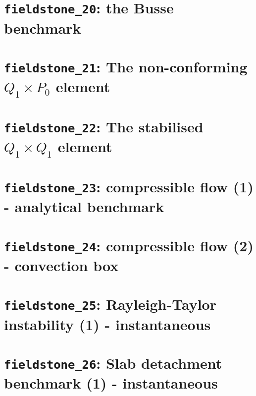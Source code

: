 \documentclass[a4paper]{article}
\begin{document}
\newpage
\section{{\tt fieldstone\_20}: the Busse benchmark \label{f20}}


\newpage
\section{{\tt fieldstone\_21}: The non-conforming $Q_1 \times P_0$ element \label{f21}}


\newpage
\section{{\tt fieldstone\_22}: The stabilised $Q_1 \times Q_1$ element \label{f22}} 


\newpage
\section{{\tt fieldstone\_23}: compressible flow (1) - analytical benchmark \label{f23}}


\newpage
\section{{\tt fieldstone\_24}: compressible flow (2) - convection box \label{f24}}


\newpage
\section{{\tt fieldstone\_25}: Rayleigh-Taylor instability (1) - instantaneous \label{f25}}


\newpage
\section{{\tt fieldstone\_26}: Slab detachment benchmark (1) - instantaneous \label{f26}}

\end{document}
